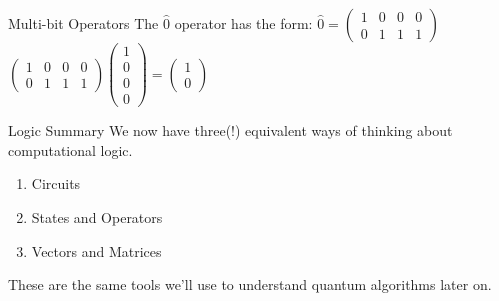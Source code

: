 \documentclass{beamer}
\begin{document}
\begin{frame}{Multi-bit Operators}
    The $\hat{0}$ operator has the form:\vfill
    \centering
    \begin{math}
        \hat{0} = \begin{pmatrix}
            1 & 0 & 0 & 0 \\
            0 & 1 & 1 & 1 
        \end{pmatrix}
    \end{math}\vfill
    \begin{math}
        \begin{pmatrix}
            1 & 0 & 0 & 0 \\ 
            0 & 1 & 1 & 1 
        \end{pmatrix}
        \begin{pmatrix} 1 \\ 0 \\ 0 \\ 0 \end{pmatrix} = \begin{pmatrix} 1 \\ 0 \end{pmatrix} 
    \end{math}
\end{frame}

\begin{frame}{Logic Summary}
    We now have three(!) equivalent ways of thinking about computational logic.\vfill
    \begin{enumerate}
        \item Circuits
        \item States and Operators
        \item Vectors and Matrices
    \end{enumerate}\vfill
    These are the same tools we'll use to understand quantum algorithms later on.
\end{frame}




\end{document}
